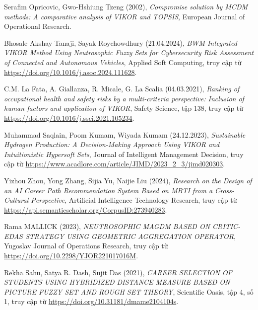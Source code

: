 \begin{thebibliography}{99}
    Serafim Opricovic, Gwo-Hshiung Tzeng (2002),
    \emph{Compromise solution by MCDM methods: A comparative analysis of VIKOR and TOPSIS},
    European Journal of Operational Research.

    Bhosale Akshay Tanaji, Sayak Roychowdhury (21.04.2024),
    \emph{BWM Integrated VIKOR Method Using Neutrosophic Fuzzy Sets for Cybersecurity Risk Assessment of Connected and Autonomous Vehicles},
    Applied Soft Computing,
    truy cập từ \href{https://doi.org/10.1016/j.asoc.2024.111628}{\color{black}https://doi.org/10.1016/j.asoc.2024.111628}.

    C.M. La Fata, A. Giallanza, R. Micale, G. La Scalia (04.03.2021),
    \emph{Ranking of occupational health and safety risks by a multi-criteria perspective: Inclusion of human factors and application of VIKOR},
    Safety Science,
    tập 138,
    truy cập từ \href{https://doi.org/10.1016/j.ssci.2021.105234}{\color{black}https://doi.org/10.1016/j.ssci.2021.105234}.

    Muhammad Saqlain, Poom Kumam, Wiyada Kumam (24.12.2023), 
    \emph{Sustainable Hydrogen Production: A Decision-Making Approach Using VIKOR and Intuitionistic Hypersoft Sets},
    Journal of Intelligent Management Decision,
    truy cập từ \href{https://www.acadlore.com/article/JIMD/2023_2_3/jimd020303}{\color{black}\url{https://www.acadlore.com/article/JIMD/2023_2_3/jimd020303}}.

    Yizhou Zhou, Yong Zhang, Sijia Yu, Naijie Liu (2024),
    \emph{Research on the Design of an AI Career Path Recommendation System Based on MBTI from a Cross-Cultural Perspective},
    Artificial Intelligence Technology Research,
    truy cập từ \href{https://api.semanticscholar.org/CorpusID:273940283}{\color{black}https://api.semanticscholar.org/CorpusID:273940283}.

    Rama MALLICK (2023),
    \emph{NEUTROSOPHIC MAGDM BASED ON CRITIC-EDAS STRATEGY USING GEOMETRIC AGGREGATION OPERATOR},
    Yugoslav Journal of Operations Research,
    truy cập từ \href{https://doi.org/10.2298/YJOR221017016M}{\color{black}https://doi.org/10.2298/YJOR221017016M}.

    Rekha Sahu, Satya R. Dash, Sujit Das (2021),
    \emph{CAREER SELECTION OF STUDENTS USING HYBRIDIZED DISTANCE MEASURE BASED ON PICTURE FUZZY SET AND ROUGH SET THEORY},
    Scientific Oasis,
    tập 4, số 1,
    truy cập từ \href{https://doi.org/10.31181/dmame2104104s}{\color{black}https://doi.org/10.31181/dmame2104104s}.


\end{thebibliography}
